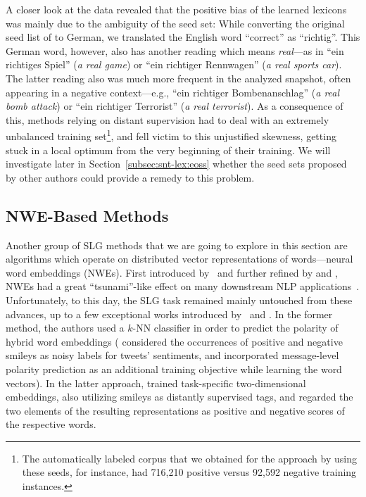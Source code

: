 A closer look at the data revealed that the positive bias of the
learned lexicons was mainly due to the ambiguity of the seed set:
While converting the original seed list of \citet{Turney:03} to
German, we translated the English word ``correct'' as ``richtig''.
This German word, however, also has another reading which means
\emph{real}---as in ``ein richtiges Spiel'' (\emph{a real game}) or
``ein richtiger Rennwagen'' (\emph{a real sports car}).  The latter
reading also was much more frequent in the analyzed snapshot, often
appearing in a negative context---e.g., ``ein richtiger
Bombenanschlag'' (\emph{a real bomb attack}) or ``ein richtiger
Terrorist'' (\emph{a real terrorist}).  As a consequence of this,
methods relying on distant supervision had to deal with an extremely
unbalanced training set\footnote{The automatically labeled corpus that
  we obtained for the approach by \citet{Kiritchenko:14} using these
  seeds, for instance, had 716,210 positive versus 92,592 negative
  training instances.}, and fell victim to this unjustified skewness,
getting stuck in a local optimum from the very beginning of their
training.  We will investigate later in
Section~\ref{subsec:snt-lex:eoss} whether the seed sets proposed by
other authors could provide a remedy to this problem.

\subsection{NWE-Based Methods}

Another group of SLG methods that we are going to explore in this
section are algorithms which operate on distributed vector
representations of words---neural word embeddings (NWEs).  First
introduced by~\citet{Bengio:03} and further refined by
\citet{Collobert:11} and \citet{Mikolov:13}, NWEs had a great
``tsunami''-like effect on many downstream NLP
applications~\cite{Manning:15}.  Unfortunately, to this day, the SLG
task remained mainly untouched from these advances, up to a few
exceptional works introduced by~\citet{Tang:14a} and \citet{Vo:16}.
In the former method, the authors used a $k$-NN classifier in order to
predict the polarity of hybrid word embeddings (\citeauthor{Tang:14a}
considered the occurrences of positive and negative smileys as noisy
labels for tweets' sentiments, and incorporated message-level polarity
prediction as an additional training objective while learning the word
vectors).  In the latter approach, \citet{Vo:16} trained task-specific
two-dimensional embeddings, also utilizing smileys as distantly
supervised tags, and regarded the two elements of the resulting
representations as positive and negative scores of the respective
words.


